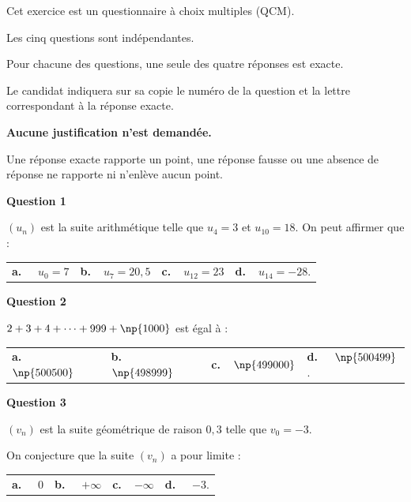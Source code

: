 \medskip

Cet exercice est un questionnaire à choix multiples (QCM). 

Les cinq questions sont indépendantes.

Pour chacune des questions, une seule des quatre réponses est exacte.

Le candidat indiquera sur sa copie le numéro de la question et la lettre correspondant à la
réponse exacte.

\textbf{Aucune justification n’est demandée.}

Une réponse exacte rapporte un point, une réponse fausse ou une absence de réponse ne rapporte ni n’enlève aucun point.

\medskip

\textbf{Question 1}

\medskip 


$\left(u_n\right)$ est la suite arithmétique telle que $u_4 = 3$ et $u_{10} = 18$. On peut affirmer que :

\medskip

\begin{tabularx}{\linewidth}{*{4}{X}}
\textbf{a.~~} $ u_0 = 7$ &\textbf{b.~~}$u_7 = 20,5$&\textbf{c.~~}$u_{12} = 23$& \textbf{d.~~}$u_{14} = -28$.
\end{tabularx}

\medskip

\textbf{Question 2}

\medskip 

$2 + 3 + 4 + \dots + 999 + \np{1000}$ est égal à :

\medskip

\begin{tabularx}{\linewidth}{*{4}{X}}
\textbf{a.~~} $\np{500500}$ &\textbf{b.~~} $\np{498999}$&\textbf{c.~~}$\np{499000}$& \textbf{d.~~} $\np{500499}$.
\end{tabularx}

\medskip

\textbf{Question 3}

\medskip


$\left(v_n\right)$ est la suite géométrique de raison $0,3$ telle que $v_0 = -3$.

On conjecture que la suite $\left(v_n\right)$ a pour limite : 

\medskip

\begin{tabularx}{\linewidth}{*{4}{X}}
\textbf{a.~~} $0$ &\textbf{b.~~} $+\infty$&\textbf{c.~~}$-\infty$& \textbf{d.~~} $-3$.
\end{tabularx}

